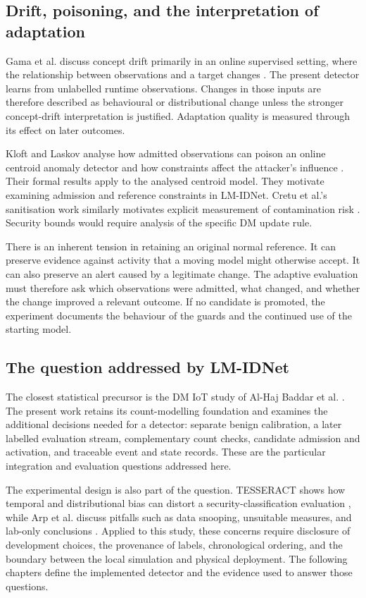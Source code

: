 \subsection{Drift, poisoning, and the interpretation of adaptation}

Gama et al. discuss concept drift primarily in an online supervised
setting, where the relationship between observations and a target changes
\cite{gama2014}. The present detector learns from unlabelled runtime
observations. Changes in those inputs are therefore described
as behavioural or distributional change unless the stronger concept-drift
interpretation is justified. Adaptation quality is measured through its
effect on later outcomes.

Kloft and Laskov analyse how admitted observations can poison an online
centroid anomaly detector and how constraints affect the attacker's
influence \cite{kloft2012}. Their formal results apply to the analysed
centroid model. They motivate examining admission and reference constraints
in LM-IDNet. Cretu et al.'s sanitisation work similarly motivates explicit
measurement of contamination risk \cite{cretu2008}. Security bounds would
require analysis of the specific DM update rule.

There is an inherent tension in retaining an original normal reference.
It can preserve evidence against activity that a moving model might
otherwise accept. It can also preserve an alert caused by a legitimate
change. The adaptive evaluation must therefore ask which observations were
admitted, what changed, and whether the change improved a relevant outcome.
If no candidate is promoted, the experiment documents the behaviour of the
guards and the continued use of the starting model.

\subsection{The question addressed by LM-IDNet}

The closest statistical precursor is the DM IoT study of Al-Haj Baddar et
al. \cite{alhajbaddar2025iot}. The present work retains its count-modelling
foundation and examines the additional decisions needed for a detector:
separate benign calibration, a later labelled evaluation stream,
complementary count checks, candidate admission and activation, and
traceable event and state records. These are the particular integration
and evaluation questions addressed here.

The experimental design is also part of the question. TESSERACT shows how
temporal and distributional bias can distort a security-classification
evaluation \cite{pendlebury2019}, while Arp et al. discuss pitfalls such as
data snooping, unsuitable measures, and lab-only conclusions
\cite{arp2022}. Applied to this study, these concerns require disclosure
of development choices, the provenance of labels, chronological ordering,
and the boundary between the local simulation and physical deployment.
The following chapters define the implemented detector and the evidence
used to answer those questions.
